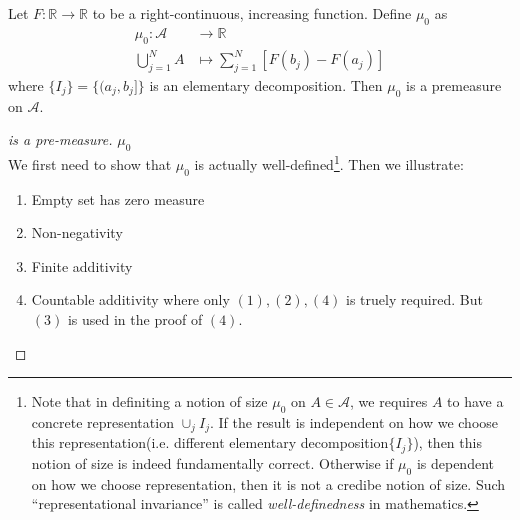 \begin{proposition}Let $F:\mathbb{R}\to\mathbb{R}$ to be a right-continuous, increasing function. Define $\mu_0$ as
\begin{equation}
\begin{aligned}
\mu_0 : \mathcal A &\to \mathbb{R} \\
\bigcup_{j=1}^N A &\mapsto \sum_{j=1}^N [F(b_j)-F(a_j)]
\end{aligned}
\end{equation}
where $\{I_j\}=\{(a_j,b_j]\}$ is an elementary decomposition. Then $\mu_0$ is a premeasure on $\mathcal A$.

\end{proposition}\begin{proof}[ is a pre-measure]\textbf{$\mu_0$}\\
We first need to show that $\mu_0$ is actually well-defined\footnote{Note that in definiting a notion of size $\mu_0$ on $A\in \mathcal A$, we requires $A$ to have a concrete representation $\cup_j I_j$. If the result is independent on
how we choose this representation(i.e. different elementary decomposition$\{I_j\}$), then this notion of size is indeed fundamentally correct. Otherwise if $\mu_0$ is dependent on how we choose representation, then it is not a credibe notion of size. Such ``representational invariance'' is called \textit{well-definedness} in mathematics.}. Then we illustrate:

\begin{enumerate}
\item Empty set has zero measure
\item Non-negativity
\item Finite additivity
\item Countable additivity
where only $(1),(2),(4)$ is truely required. But $(3)$ is used in the proof of $(4)$.
\end{enumerate}

\end{proof}